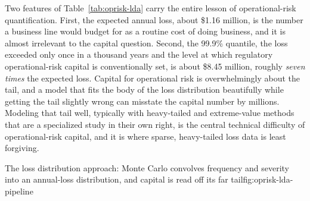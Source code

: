 \documentclass[../ai_in_finance]{subfiles}
\begin{document}
Two features of Table~\ref{tab:oprisk-lda} carry the entire lesson of operational-risk quantification. First, the expected annual loss, about \$1.16 million, is the number a business line would budget for as a routine cost of doing business, and it is almost irrelevant to the capital question. Second, the 99.9\% quantile, the loss exceeded only once in a thousand years and the level at which regulatory operational-risk capital is conventionally set, is about \$8.45 million, roughly \emph{seven times} the expected loss. Capital for operational risk is overwhelmingly about the tail, and a model that fits the body of the loss distribution beautifully while getting the tail slightly wrong can misstate the capital number by millions. Modeling that tail well, typically with heavy-tailed and extreme-value methods that are a specialized study in their own right, is the central technical difficulty of operational-risk capital, and it is where sparse, heavy-tailed loss data is least forgiving.

\begin{bookfigure}[htbp]{The loss distribution approach: Monte Carlo convolves frequency and severity into an annual-loss distribution, and capital is read off its far tail}{fig:oprisk-lda-pipeline}
\end{bookfigure}
\end{document}
